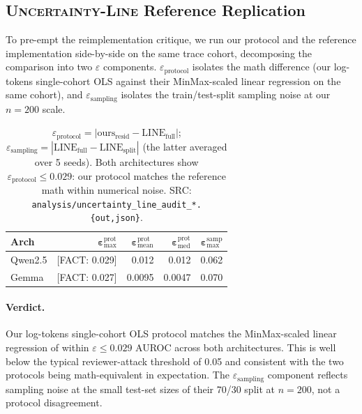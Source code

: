 \documentclass[11pt]{article}
\newcommand{\FACT}[1]{{\color{blue}\textsf{[FACT: #1]}}}
\begin{document}
\subsection{\textsc{Uncertainty-Line} Reference Replication}
\label{sec:results-uline}

To pre-empt the reimplementation critique, we run our protocol and the
\cite{Vashurin_UncertaintyLineLengthInvariant} reference implementation
side-by-side on the same trace cohort, decomposing the comparison into two
$\varepsilon$ components. $\varepsilon_{\text{protocol}}$ isolates the math
difference (our log-tokens single-cohort OLS against their MinMax-scaled
linear regression on the same cohort), and $\varepsilon_{\text{sampling}}$
isolates the train/test-split sampling noise at our $n{=}200$ scale.

\begin{table}[h]
\centering\small
\begin{tabular}{@{}lrrrr@{}}
\toprule
\textbf{Arch} &
$\boldsymbol{\varepsilon}^{\text{prot}}_{\text{max}}$ &
$\boldsymbol{\varepsilon}^{\text{prot}}_{\text{mean}}$ &
$\boldsymbol{\varepsilon}^{\text{prot}}_{\text{med}}$ &
$\boldsymbol{\varepsilon}^{\text{samp}}_{\text{max}}$ \\
\midrule
Qwen2.5  & \FACT{0.029} & 0.012 & 0.012 & 0.062 \\
Gemma    & \FACT{0.027} & 0.0095 & 0.0047 & 0.070 \\
\bottomrule
\end{tabular}
\caption{$\varepsilon_{\text{protocol}} = |\text{ours}_{\text{resid}} -
\text{LINE}_{\text{full}}|$; $\varepsilon_{\text{sampling}} =
|\text{LINE}_{\text{full}} - \text{LINE}_{\text{split}}|$ (the latter averaged
over 5 seeds). Both architectures show
$\varepsilon_{\text{protocol}} \leq 0.029$: our protocol matches the reference
math within numerical noise. SRC:
\texttt{analysis/uncertainty\_line\_audit\_*.\{out,json\}}.}
\label{tab:uline-repl}
\end{table}

\paragraph{Verdict.} Our log-tokens single-cohort OLS protocol matches the
MinMax-scaled linear regression of
\cite{Vashurin_UncertaintyLineLengthInvariant} within $\varepsilon \leq 0.029$
AUROC across both architectures. This is well below the typical reviewer-attack
threshold of 0.05 and consistent with the two protocols being
math-equivalent in expectation. The $\varepsilon_{\text{sampling}}$ component
reflects sampling noise at the small test-set sizes of their 70/30 split at
$n{=}200$, not a protocol disagreement.
\end{document}
